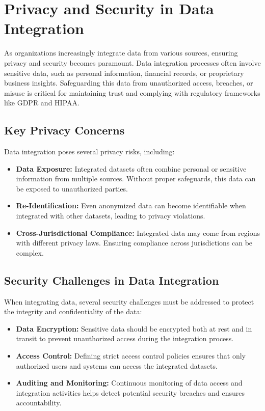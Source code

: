 \documentclass[12pt]{article}
\begin{document}
\section{Privacy and Security in Data Integration}
As organizations increasingly integrate data from various sources, ensuring privacy and security becomes paramount. Data integration processes often involve sensitive data, such as personal information, financial records, or proprietary business insights. Safeguarding this data from unauthorized access, breaches, or misuse is critical for maintaining trust and complying with regulatory frameworks like GDPR and HIPAA.

\subsection{Key Privacy Concerns}
Data integration poses several privacy risks, including:
\begin{itemize}
    \item \textbf{Data Exposure:} Integrated datasets often combine personal or sensitive information from multiple sources. Without proper safeguards, this data can be exposed to unauthorized parties.
    \item \textbf{Re-Identification:} Even anonymized data can become identifiable when integrated with other datasets, leading to privacy violations.
    \item \textbf{Cross-Jurisdictional Compliance:} Integrated data may come from regions with different privacy laws. Ensuring compliance across jurisdictions can be complex.
\end{itemize}

\subsection{Security Challenges in Data Integration}
When integrating data, several security challenges must be addressed to protect the integrity and confidentiality of the data:
\begin{itemize}
    \item \textbf{Data Encryption:} Sensitive data should be encrypted both at rest and in transit to prevent unauthorized access during the integration process.
    \item \textbf{Access Control:} Defining strict access control policies ensures that only authorized users and systems can access the integrated datasets.
    \item \textbf{Auditing and Monitoring:} Continuous monitoring of data access and integration activities helps detect potential security breaches and ensures accountability.
\end{itemize}
\end{document}
